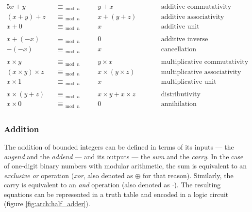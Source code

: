 \begin{alignat*}{5}
    x + y \quad &\equiv_{\bmod n} &\quad& y + x
    && \qquad \text{additive commutativity}
    \\
    (x + y) + z \quad &\equiv_{\bmod n} &\quad& x + (y + z)
    && \qquad \text{additive associativity}
    \\
    x + 0 \quad &\equiv_{\bmod n} &\quad& x
    && \qquad \text{additive unit}
    \\\\
    x + (-x) \quad &\equiv_{\bmod n} &\quad& 0
    && \qquad \text{additive inverse}
    \\
    -(-x) \quad &\equiv_{\bmod n} &\quad& x
    && \qquad \text{cancellation}
    \\\\
    x \times y \quad &\equiv_{\bmod n} &\quad& y \times x
    && \qquad \text{multiplicative commutativity}
    \\
    (x \times y) \times z \quad &\equiv_{\bmod n} &\quad& x \times (y \times z)
    && \qquad \text{multiplicative associativity}
    \\
    x \times 1 \quad &\equiv_{\bmod n} &\quad& x
    && \qquad \text{multiplicative unit}
    \\\\
    x \times (y + z) \quad &\equiv_{\bmod n} &\quad& x \times y + x \times z
    && \qquad \text{distributivity}
    \\
    x \times 0 \quad &\equiv_{\bmod n} &\quad& 0
    && \qquad \text{annihilation}
    \\
\end{alignat*}

\subsubsection{Addition}

\label{subsubsec:arch:add}

The addition of bounded integers can be defined in terms of its inputs --- the
\textit{augend} and the \textit{addend} --- and its outputs --- the \textit{sum}
and the \textit{carry}.  In the case of one-digit binary numbers with modular
arithmetic, the sum is equivalent to an \textit{exclusive or} operation
(\textit{xor}, also denoted as $\oplus$ for that reason).  Similarly, the carry
is equivalent to an \textit{and} operation (also denoted as $\cdot$).  The
resulting equations can be represented in a truth table and encoded in a logic
circuit (figure \ref{fig:arch:half_adder}).

